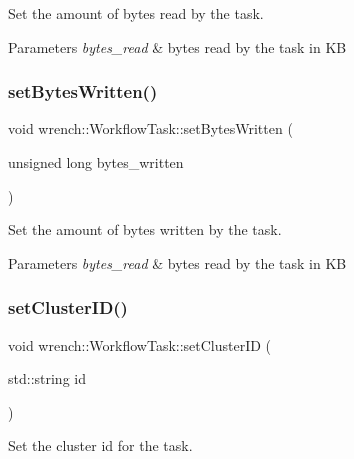 Set the amount of bytes read by the task. 


\begin{DoxyParams}{Parameters}
{\em bytes\+\_\+read} & bytes read by the task in KB \\
\hline
\end{DoxyParams}
\mbox{\label{classwrench_1_1_workflow_task_a8291e3248b7246eab498fc0378199b76}} 
\subsubsection{\texorpdfstring{set\+Bytes\+Written()}{setBytesWritten()}}
{\footnotesize\ttfamily void wrench\+::\+Workflow\+Task\+::set\+Bytes\+Written (\begin{DoxyParamCaption}\item[{unsigned long}]{bytes\+\_\+written }\end{DoxyParamCaption})}



Set the amount of bytes written by the task. 


\begin{DoxyParams}{Parameters}
{\em bytes\+\_\+read} & bytes read by the task in KB \\
\hline
\end{DoxyParams}
\mbox{\label{classwrench_1_1_workflow_task_ab8d621c9cf50b489fd6b092bea59872a}} 
\subsubsection{\texorpdfstring{set\+Cluster\+I\+D()}{setClusterID()}}
{\footnotesize\ttfamily void wrench\+::\+Workflow\+Task\+::set\+Cluster\+ID (\begin{DoxyParamCaption}\item[{std\+::string}]{id }\end{DoxyParamCaption})}



Set the cluster id for the task. 


